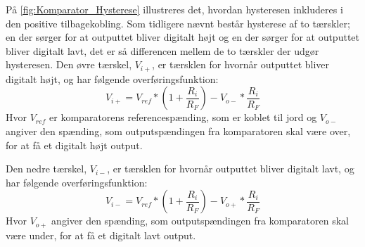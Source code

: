 \noindent
%
På \autoref{fig:Komparator_Hysterese} illustreres det, hvordan hysteresen inkluderes i den positive tilbagekobling. Som tidligere nævnt består hysterese af to tærskler; en der sørger for at outputtet bliver digitalt højt og en der sørger for at outputtet bliver digitalt lavt, det er så differencen mellem de to tærskler der udgør hysteresen. Den øvre tærskel, $V_{i+}$, er tærsklen for hvornår outputtet bliver digitalt højt, og har følgende overføringsfunktion:
%
\begin{equation}
	V_{i+} = V_{ref}*\left(1+\frac{R_i}{R_F}\right)-V_{o-}*\frac{R_i}{R_F}
\end{equation}
%
Hvor $V_{ref}$ er komparatorens referencespænding, som er koblet til jord og $V_{o-}$ angiver den spænding, som outputspændingen fra komparatoren skal være over, for at få et digitalt højt output.

Den nedre tærskel, $V_{i-}$, er tærsklen for hvornår outputtet bliver digitalt lavt, og har følgende overføringsfunktion:
%
\begin{equation}
	V_{i-} = V_{ref}*\left(1+\frac{R_i}{R_F}\right)-V_{o+}*\frac{R_i}{R_F}
\end{equation}
%
Hvor $V_{o+}$ angiver den spænding, som outputspændingen fra komparatoren skal være under, for at få et digitalt lavt output. 

